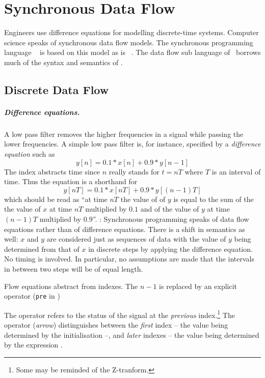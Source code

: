 \chapter{Synchronous Data Flow}\label{data-flow}

Engineers use difference equations for modelling discrete-time systems.
Computer science speaks of synchronous data flow models.  The
synchronous programming language \lustre~\cite{lustre} is based on this
model as is \signal~\cite{signal}.  The data flow sub language of \se\
borrows much of the syntax and semantics of \lustre.

\section{Discrete Data Flow}\label{data-flow-informal}

\paragraph{Difference equations.}
A low pass filter removes the higher frequencies in a signal while passing the lower frequencies. A simple low pass filter is, for instance, specified by a \emph{difference equation} such as
% 
$$y[n] = 0.1 * x[n] + 0.9 * y[n-1]$$
% 
The index abstracts time since $n$ really stands for $t = nT$ where $T$ is an interval of time. Thus the equation is a shorthand for 
% 
$$y[nT] = 0.1 * x[nT] + 0.9 * y[(n-1)T]$$
% 
which should be read as ``at time $nT$ the value of of $y$ is equal to the sum of the the value of $x$ at time $nT$ multiplied by $0.1$ and of the value of $y$ at time $(n-1)T$ multiplied by $0.9$''.
:
Synchronous programming speaks of data flow equations rather than of
difference equations. There is a shift in semantics as well:
$x$ and $y$ are considered just as sequences of data with the value of $y$ being determined from that of $x$ in discrete steps by applying the difference equation. No timing is involved. In particular, no assumptions are made that the intervals in between two steps will be of equal length.

Flow equations abstract from indexes. The $n-1$ is replaced by an
explicit operator (\texttt{pre} in \se)
%
\begin{center}
\end{center}
%
The operator  refers to the status of the signal  at the 
\emph{previous} index.\footnote{Some may be
reminded of the Z-tranform.} The operator \pp{->} (\emph{arrow}) 
distinguishes between the  \emph{first} index -- the 
value being determined by the initialisation  --, and 
\emph{later} indexes -- the value being determined by 
the expression .

